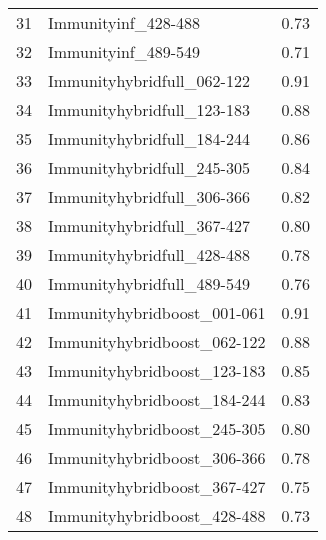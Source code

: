 \begin{table}[ht]
\begin{tabular}{rlr}
  31 & Immunityinf\_428-488 & 0.73 \\ 
  32 & Immunityinf\_489-549 & 0.71 \\ 
  33 & Immunityhybridfull\_062-122 & 0.91 \\ 
  34 & Immunityhybridfull\_123-183 & 0.88 \\ 
  35 & Immunityhybridfull\_184-244 & 0.86 \\ 
  36 & Immunityhybridfull\_245-305 & 0.84 \\ 
  37 & Immunityhybridfull\_306-366 & 0.82 \\ 
  38 & Immunityhybridfull\_367-427 & 0.80 \\ 
  39 & Immunityhybridfull\_428-488 & 0.78 \\ 
  40 & Immunityhybridfull\_489-549 & 0.76 \\ 
  41 & Immunityhybridboost\_001-061 & 0.91 \\ 
  42 & Immunityhybridboost\_062-122 & 0.88 \\ 
  43 & Immunityhybridboost\_123-183 & 0.85 \\ 
  44 & Immunityhybridboost\_184-244 & 0.83 \\ 
  45 & Immunityhybridboost\_245-305 & 0.80 \\ 
  46 & Immunityhybridboost\_306-366 & 0.78 \\ 
  47 & Immunityhybridboost\_367-427 & 0.75 \\ 
  48 & Immunityhybridboost\_428-488 & 0.73 \\ 
   \hline
\end{tabular}
\end{table}

